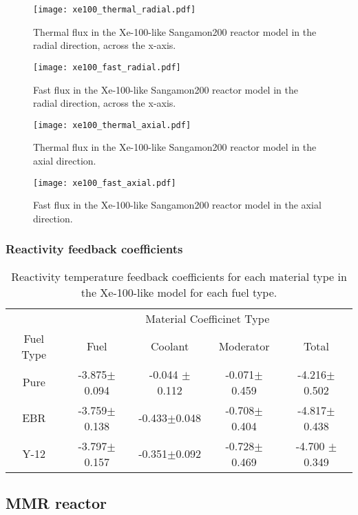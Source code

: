 \begin{figure}
        \centering 
        \texttt{[image: xe100\_thermal\_radial.pdf]}
        \caption{Thermal flux in the Xe-100-like Sangamon200 
        reactor model in the radial direction, across the 
        x-axis.}
        \label{fig:xe100_thermal_radial}
\end{figure}

\begin{figure}
        \centering 
        \texttt{[image: xe100\_fast\_radial.pdf]}
        \caption{Fast flux in the Xe-100-like Sangamon200 
        reactor model in the radial direction, across the 
        x-axis.}
        \label{fig:xe100_fast_radial}
\end{figure}
\begin{figure}
        \centering 
        \texttt{[image: xe100\_thermal\_axial.pdf]}
        \caption{Thermal flux in the Xe-100-like Sangamon200 
        reactor model in the axial direction.}
        \label{fig:xe100_thermal_axial}
\end{figure}
\begin{figure}
        \centering 
        \texttt{[image: xe100\_fast\_axial.pdf]}
        \caption{Fast flux in the Xe-100-like Sangamon200 
        reactor model in the axial direction.}
        \label{fig:xe100_fast_axial}
\end{figure}
\subsubsection{Reactivity feedback coefficients}

\begin{table}
        \centering
        \caption{Reactivity temperature feedback coefficients for 
        each material type in the Xe-100-like model for each fuel 
        type.}
        \begin{tabular}{c c c c c}
            \hline 
            & \multicolumn{4}{c}{Material Coefficinet Type} \\
            Fuel Type & Fuel & Coolant & Moderator & Total \\
            \hline
            Pure & -3.875$\pm$0.094 & -0.044 $\pm$ 0.112 & -0.071$\pm$0.459 & -4.216$\pm$0.502\\
            \gls{EBR} & -3.759$\pm$0.138 & -0.433$\pm$0.048 & -0.708$\pm$0.404 & -4.817$\pm$0.438\\
            Y-12 & -3.797$\pm$0.157 & -0.351$\pm$0.092 & -0.728$\pm$0.469 & -4.700 $\pm$0.349\\
            \hline

        \end{tabular}
\end{table}

\subsection{MMR reactor}
